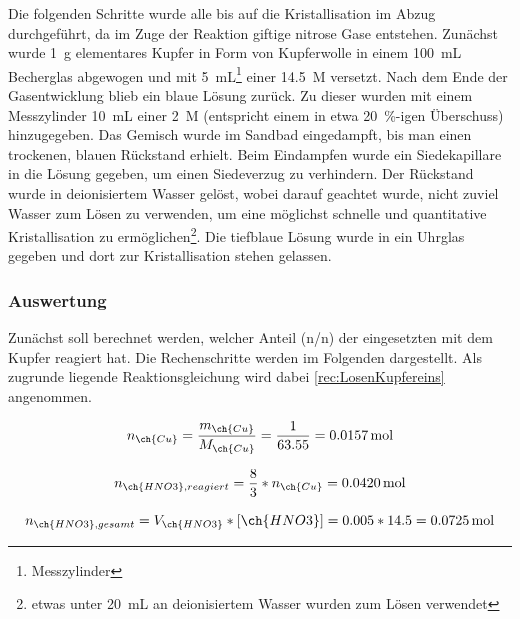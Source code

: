 \documentclass{article}
\begin{document}
        Die folgenden Schritte wurde alle bis auf die Kristallisation im Abzug durchgeführt, da im Zuge der Reaktion giftige nitrose Gase entstehen. Zunächst wurde \SI[mode=text]{1}{\gram} elementares Kupfer in Form von Kupferwolle in einem \SI[mode=text]{100}{\milli\liter} Becherglas abgewogen und mit \SI[mode=text]{5}{\milli\liter}\footnote{Messzylinder} einer \SI[mode=text]{14.5}{M}  versetzt. Nach dem Ende der Gasentwicklung blieb ein blaue  Lösung zurück. Zu dieser wurden mit einem Messzylinder \SI[mode=text]{10}{\milli\liter} einer \SI[mode=text]{2}{M}  (entspricht einem in etwa \SI[mode=text]{20}{\percent}-igen Überschuss) hinzugegeben. Das Gemisch wurde im Sandbad eingedampft, bis man einen trockenen, blauen Rückstand erhielt. Beim Eindampfen wurde ein Siedekapillare in die Lösung gegeben, um einen Siedeverzug zu verhindern. Der Rückstand wurde in deionisiertem Wasser gelöst, wobei darauf geachtet wurde, nicht zuviel Wasser zum Lösen zu verwenden, um eine möglichst schnelle und quantitative Kristallisation zu ermöglichen\footnote{etwas unter \SI[mode=text]{20}{\milli\liter} an deionisiertem Wasser wurden zum Lösen verwendet}. Die tiefblaue Lösung wurde in ein Uhrglas gegeben und dort zur Kristallisation stehen gelassen. 
    
     
      \subsubsection{Auswertung} \label{sec:AuswertungKupfersulfat}
      
        Zunächst soll berechnet werden, welcher Anteil (n/n) der eingesetzten  mit dem Kupfer reagiert hat. Die Rechenschritte werden im Folgenden dargestellt. Als zugrunde liegende Reaktionsgleichung wird dabei \ref{rec:LosenKupfereins} angenommen.
        
        \begin{equation}
          n_{\ch{Cu}} = \frac{m_{\ch{Cu}}}{M_{\ch{Cu}}} = \frac{1}{63.55} = \SI[mode=text]{0.0157}{\mole}
        \end{equation}
        
        \begin{equation}
          n_{\ch{HNO3}, reagiert} = \frac{8}{3} * n_{\ch{Cu}} = \SI[mode=text]{0.0420}{\mole}
        \end{equation}
        
        \begin{equation}
          n_{\ch{HNO3}, gesamt} = V_{\ch{HNO3}} * [\ch{HNO3}] = 0.005 * 14.5 = \SI[mode=text]{0.0725}{\mole}
        \end{equation}
        
\end{document}
